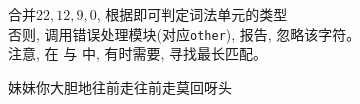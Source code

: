 \begin{frame}{}
  \begin{columns}
      \begin{center}
      \end{center}
      \begin{center}
      \end{center}
  \end{columns}

  \pause
  \vspace{0.30cm}
  \begin{center}
     合并$22, 12, 9, 0$, 根据即可判定词法单元的类型 \\[4pt]
    否则, 调用错误处理模块(对应\texttt{other}), 报告, 忽略该字符。 \\[4pt]
    注意, 在 \floatnum{} 与 \scinum{}中, 有时需要, 寻找最长匹配。
  \end{center}
\end{frame}

\begin{frame}{}
  \begin{center}
  \end{center}


  \begin{center}
    妹妹\quad 你大胆地往前走\quad 往前走\quad 莫回呀头
  \end{center}
\end{frame}
